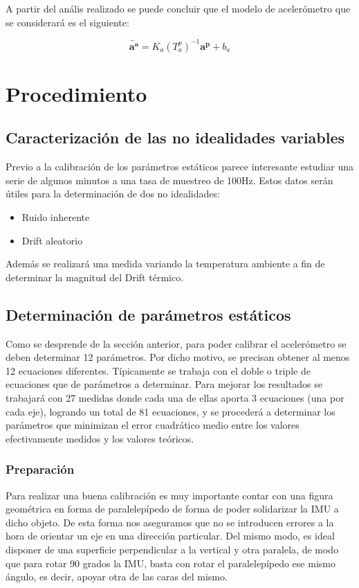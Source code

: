 \documentclass[main]{subfiles}
\begin{document}
A partir del anális realizado se puede concluir que el modelo de acelerómetro que se considerará es el siguiente:

\begin{equation}
\tilde{\mathbf{a^a}}=K_a(T_a^p)^{-1}\mathbf{a^p}+b_a
\label{ec:modelo_acc}
\end{equation}

\section{Procedimiento}
\subsection{Caracterización de las no idealidades variables}

Previo a la calibración de los parámetros estáticos parece interesante estudiar una serie de algunos minutos a una tasa de muestreo de 100Hz. Estos datos serán útiles para la determinación de dos no idealidades:  
\begin{itemize}
\item Ruido inherente
\item Drift aleatorio
\end{itemize}

Además se realizará una medida variando la temperatura ambiente a fin de determinar la magnitud del Drift térmico.

\subsection{Determinación de parámetros estáticos}

Como se desprende de la sección anterior, para poder calibrar el acelerómetro se deben determinar 12 parámetros. Por dicho motivo, se precisan obtener al menos 12 ecuaciones diferentes. Típicamente se trabaja con el doble o triple de ecuaciones que de parámetros a determinar. Para mejorar los resultados se trabajará con 27 medidas donde cada una de ellas aporta 3 ecuaciones (una por cada eje), logrando un total de 81 ecuaciones, y se procederá a determinar los parámetros que minimizan el error cuadrático medio entre los valores efectivamente medidos y los valores teóricos. 

\subsubsection*{Preparación}
Para realizar una buena calibración es muy importante contar con una figura geométrica en forma de paralelepípedo de forma de poder solidarizar la IMU a dicho objeto. De esta forma nos aseguramos que no se introducen errores a la hora de orientar un eje en una dirección particular. Del mismo modo, es ideal disponer de una superficie perpendicular a la vertical y otra paralela, de modo que para rotar 90 grados la IMU, basta con rotar el paralelepípedo ese mismo ángulo, es decir, apoyar otra de las caras del mismo. \\
\end{document}
